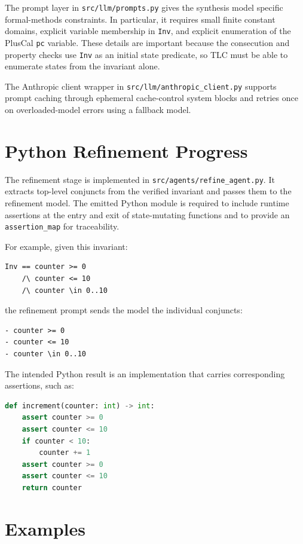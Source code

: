 \documentclass[11pt]{article}
\begin{document}
The prompt layer in \texttt{src/llm/prompts.py} gives the synthesis model
specific formal-methods constraints. In particular, it requires small finite
constant domains, explicit variable membership in \texttt{Inv}, and explicit
enumeration of the PlusCal \texttt{pc} variable. These details are important
because the consecution and property checks use \texttt{Inv} as an initial
state predicate, so TLC must be able to enumerate states from the invariant
alone.

The Anthropic client wrapper in \texttt{src/llm/anthropic\_client.py} supports
prompt caching through ephemeral cache-control system blocks and retries once
on overloaded-model errors using a fallback model.

\section{Python Refinement Progress}

The refinement stage is implemented in \texttt{src/agents/refine\_agent.py}.
It extracts top-level conjuncts from the verified invariant and passes them to
the refinement model. The emitted Python module is required to include runtime
assertions at the entry and exit of state-mutating functions and to provide an
\texttt{assertion\_map} for traceability.

For example, given this invariant:

\begin{lstlisting}
Inv == counter >= 0
    /\ counter <= 10
    /\ counter \in 0..10
\end{lstlisting}

the refinement prompt sends the model the individual conjuncts:

\begin{lstlisting}
- counter >= 0
- counter <= 10
- counter \in 0..10
\end{lstlisting}

The intended Python result is an implementation that carries corresponding
assertions, such as:

\begin{lstlisting}[language=Python]
def increment(counter: int) -> int:
    assert counter >= 0
    assert counter <= 10
    if counter < 10:
        counter += 1
    assert counter >= 0
    assert counter <= 10
    return counter
\end{lstlisting}

\section{Examples}
\end{document}
